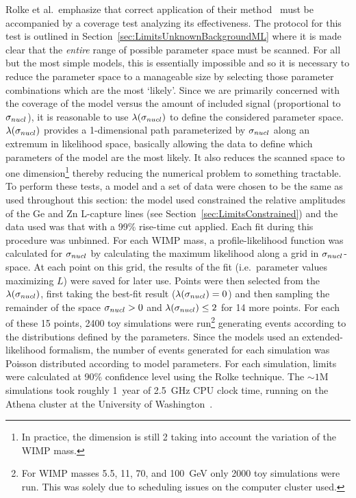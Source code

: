 Rolke et al.~emphasize that correct application of their method~\cite{Rol05} must be accompanied by a coverage test analyzing its effectiveness.  The protocol for this test is outlined in Section~\ref{sec:LimitsUnknownBackgroundML} where it is made clear that the \emph{entire} range of possible parameter space must be scanned.  For all but the most simple models, this is essentially impossible and so it is necessary to reduce the parameter space to a manageable size by selecting those parameter combinations which are the most `likely'.  Since we are primarily concerned with the coverage of the model versus the amount of included signal (proportional to $\sigma_{nucl}$), it is reasonable to use $\lambda(\sigma_{nucl})$ to define the considered parameter space.  $\lambda(\sigma_{nucl})$ provides a 1-dimensional path parameterized by $\sigma_{nucl}$ along an extremum in likelihood space, basically allowing the data to define which parameters of the model are the most likely.  It also reduces the scanned space to one dimension\footnote{In practice, the dimension is still 2 taking into account the variation of the WIMP mass.} thereby reducing the numerical problem to something tractable.  
To perform these tests, a model and a set of data were chosen to be the same as used throughout this section: the model used constrained the relative amplitudes of the Ge and Zn L-capture lines (see Section~\ref{sec:LimitsConstrained}) and the data used was that with a 99\% rise-time cut applied.  Each fit during this procedure was unbinned.  For each WIMP mass, a profile-likelihood function was calculated for $\sigma_{nucl}$ by calculating the maximum likelihood along a grid in $\sigma_{nucl}$-space.  At each point on this grid, the results of the fit (i.e.~parameter values maximizing $L$) were saved for later use.  Points were then selected from the $\lambda(\sigma_{nucl})$, first taking the best-fit result ($\lambda(\sigma_{nucl}) = 0$) and then sampling the remainder of the space $\sigma_{nucl} > 0$ and $\lambda(\sigma_{nucl}) \leq 2$ for 14 more points.  For each of these 15 points, 2400 toy simulations were run\footnote{For WIMP masses 5.5, 11, 70, and 100~GeV only 2000 toy simulations were run.  This was solely due to scheduling issues on the computer cluster used.} generating events according to the distributions defined by the parameters.  Since the models used an extended-likelihood formalism, the number of events generated for each simulation was Poisson distributed according to model parameters.  For each simulation, limits were calculated at 90\% confidence level using the Rolke technique.  The $\sim1$M simulations took roughly 1~year of 2.5~GHz CPU clock time, running on the Athena cluster at the University of Washington~\cite{Athena}.  

